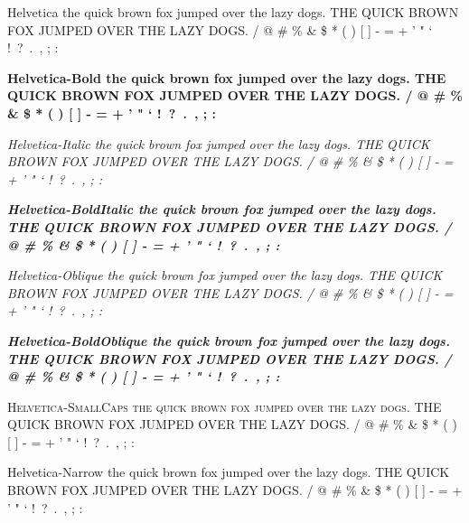 \documentclass{article}
\begin{document}
\newpage
{\selectfont
Helvetica \newline
the quick brown fox jumped over the lazy dogs. \newline
THE QUICK BROWN FOX JUMPED OVER THE LAZY DOGS.  / @ \# \% \& \$ * ( ) [ ] - = + ' " ` !\ ?\ .\ , ; :  \par
{\bfseries
Helvetica-Bold \newline
the quick brown fox jumped over the lazy dogs. \newline
THE QUICK BROWN FOX JUMPED OVER THE LAZY DOGS.  / @ \# \% \& \$ * ( ) [ ] - = + ' " ` !\ ?\ .\ , ; : } \par
{\itshape
Helvetica-Italic \newline
the quick brown fox jumped over the lazy dogs. \newline
THE QUICK BROWN FOX JUMPED OVER THE LAZY DOGS.  / @ \# \% \& \$ * ( ) [ ] - = + ' " ` !\ ?\ .\ , ; : } \par
{\bfseries \itshape
Helvetica-BoldItalic \newline
the quick brown fox jumped over the lazy dogs. \newline
THE QUICK BROWN FOX JUMPED OVER THE LAZY DOGS.  / @ \# \% \& \$ * ( ) [ ] - = + ' " ` !\ ?\ .\ , ; : } \par
{\slshape
Helvetica-Oblique \newline
the quick brown fox jumped over the lazy dogs. \newline
THE QUICK BROWN FOX JUMPED OVER THE LAZY DOGS.  / @ \# \% \& \$ * ( ) [ ] - = + ' " ` !\ ?\ .\ , ; : } \par
{\bfseries \slshape
Helvetica-BoldOblique \newline
the quick brown fox jumped over the lazy dogs. \newline
THE QUICK BROWN FOX JUMPED OVER THE LAZY DOGS.  / @ \# \% \& \$ * ( ) [ ] - = + ' " ` !\ ?\ .\ , ; : } \par
{\scshape
Helvetica-SmallCaps \newline
the quick brown fox jumped over the lazy dogs. \newline
THE QUICK BROWN FOX JUMPED OVER THE LAZY DOGS.  / @ \# \% \& \$ * ( ) [ ] - = + ' " ` !\ ?\ .\ , ; : } \par
{\selectfont
Helvetica-Narrow \newline
the quick brown fox jumped over the lazy dogs. \newline
THE QUICK BROWN FOX JUMPED OVER THE LAZY DOGS.  / @ \# \% \& \$ * ( ) [ ] - = + ' " ` !\ ?\ .\ , ; : }} \par
\end{document}
